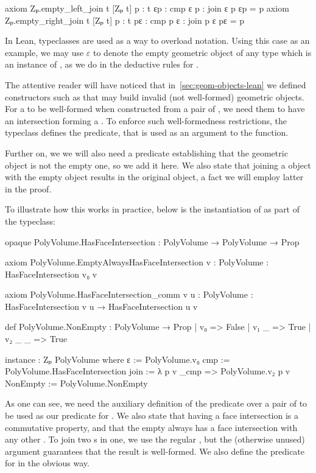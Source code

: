 \documentclass[12pt]{article} %
\begin{document}
{\begin{leancode}
axiom Zₚ.empty_left_join {t} [Zₚ t] {p : t} {εp : cmp ε p} : join ε p εp = p
axiom Zₚ.empty_right_join {t} [Zₚ t] {p : t} {pε : cmp p ε} : join p ε pε = p
\end{leancode}

In Lean, typeclasses are used as a way to overload notation. %
Using this case as an example, we may use \(\varepsilon\) to denote the empty geometric object of any type which is an instance of \zp{}, as we do in the deductive rules for \zp{}. %

The attentive reader will have noticed that in~\ref{sec:geom-objects-lean} we defined constructors such as  that may build invalid (not well-formed) geometric objects. %
For a \pvolume{} to be well-formed when constructed from a pair of \pvolume, we need them to have an intersection forming a \face. %
To enforce such well-formedness restrictions, the \zp{} typeclass defines the  predicate, that is used as an argument to the  function. %

Further on, we we will also need a predicate establishing that the geometric object is not the empty one, so we add it here. %
We also state that joining a \zp{} object with the empty object results in the original object, a fact we will employ latter in the proof. %

To illustrate how this works in practice, below is the instantiation of \pvolume{} as part of the \zp{} typeclass: %
\begin{leancode}
opaque PolyVolume.HasFaceIntersection
  : PolyVolume → PolyVolume → Prop

axiom PolyVolume.EmptyAlwaysHasFaceIntersection {v : PolyVolume} :
  HasFaceIntersection v₀ v

axiom PolyVolume.HasFaceIntersection_comm {v u : PolyVolume} :
  HasFaceIntersection v u → HasFaceIntersection u v

def PolyVolume.NonEmpty : PolyVolume → Prop
| v₀ => False
| v₁ _ => True
| v₂ _ _ => True

instance : Zₚ PolyVolume where
  ε := PolyVolume.v₀
  cmp := PolyVolume.HasFaceIntersection
  join := λ p v _cmp => PolyVolume.v₂ p v
  NonEmpty := PolyVolume.NonEmpty
\end{leancode}
As one can see, we need the auxiliary definition of the  predicate over a pair of \pvolume{} to be used as our  predicate for \pvolume{}. %
We also state that having a face intersection is a commutative property, and that the empty \pvolume{} always has a face intersection with any other \pvolume{}. %
To join two \pvolume{}s in one, we use the regular , but the (otherwise unused)  argument guarantees that the result is well-formed. %
We also define the  predicate for \pvolume{} in the obvious way. %

}
\end{document}
